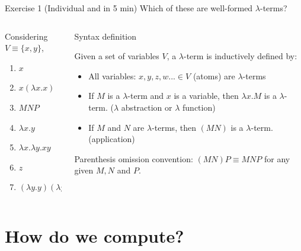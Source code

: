 \documentclass[aspectratio=169,10pt]{beamer}
\begin{document}
\begin{frame}{Exercise 1 (Individual and in 5 min)}
  Which of these are well-formed $\lambda$-terms?

  \begin{columns}
    \begin{column}{0.45\textwidth}
      Considering $V \equiv \{x,y\}$,
      \begin{enumerate}
        \item $x$
        \item $x(\lambda x.x)$
        \item $MNP$
        \item $\lambda x.y$
        \item $\lambda x. \lambda y.xy$
        \item $z$
        \item $(\lambda y.y)(\lambda y.yx)$
      \end{enumerate}
    \end{column}
    \begin{column}{0.45\textwidth}
      \begin{block}{Syntax definition}

        Given a set of variables $V$, a  $\lambda$-term is inductively defined by:

        \begin{itemize}
          \item All variables: $x, y, z, w... \in V$ (atoms) are $\lambda$-terms
          \item If $M$ is a $\lambda$-term and $x$ is a variable, then $\lambda x.M$ is a $\lambda$-term. ($\lambda$ abstraction or $\lambda$ function)
          \item If $M$ and $N$ are $\lambda$-terms, then $(MN)$ is a $\lambda$-term. (application)
        \end{itemize}

        Parenthesis omission convention: $(MN)P \equiv MNP$ for any given $M, N$ and $P$.
      \end{block}
    \end{column}
  \end{columns}
\end{frame}

\section{How do we compute?}
\end{document}
